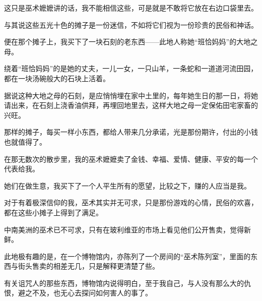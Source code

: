 \par 这只是巫术嬷嬷讲的话，我不能相信这些，可是就是不敢将它放在右边口袋里去。
\par 与其说这些五光十色的摊子是一份迷信，不如将它们视为一份珍贵的民俗和神话。
\par 便在那个摊子上，我买下了一块石刻的老东西——此地人称她“班恰妈妈”的大地之母。
\par 绕着“班恰妈妈”的是她的丈夫，一儿一女，一只山羊，一条蛇和一道道河流田园，都在一块汤碗般大的石块上活着。
\par 据说这种大地之母的石刻，是应悄悄埋在家中土里的，每年她生日的那一日，将她请出来，在石刻上浇香油供拜，再埋回地里去，这样大地之母一定保佑田宅家畜的兴旺。
\par 那样的摊子，每买一样小东西，都给人带来几分承诺，光是那份期许，付出的小钱也就值得了。
\par 在那无数次的散步里，我的巫术嬷嬷卖了金钱、幸福、爱情、健康、平安的每一个代表给我。
\par 她们在做生意，我买下了一个人平生所有的愿望，比较之下，赚的人应当是我。
\par 对于有着极深信仰的我，巫术其实并无可求，只是那份游戏的心情，民俗的欢喜，都在这些小摊子上得到了满足。
\par 中南美洲的巫术已不可求，只有在玻利维亚的市场上看见他们公开售卖，觉得新鲜。
\par 此地极有趣的是，在一个博物馆内，亦陈列了一个房间的“巫术陈列室”，里面的东西与街头售卖的相差无几，只是解释更清楚了些。
\par 有关诅咒人的那些东西，博物馆内说得明白，至于我自己，与人没有那么大的仇恨，避之不及，也无心去探问如何害人的事了。
